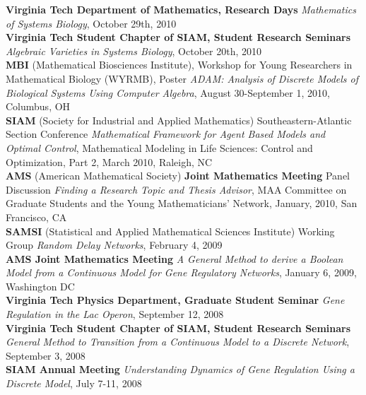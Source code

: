 \documentclass[10pt]{article}
\begin{document}
\textbf{Virginia Tech Department of Mathematics, Research Days}
\textit{Mathematics of Systems Biology}, October 29th, 2010 \\

\textbf{Virginia Tech Student Chapter of SIAM, Student Research Seminars}
\textit{Algebraic Varieties in Systems Biology}, October 20th, 2010 \\

\textbf{MBI} (Mathematical Biosciences Institute), Workshop for Young Researchers 
in Mathematical Biology (WYRMB), Poster \textit{ADAM: Analysis of Discrete
Models of Biological Systems Using Computer Algebra}, August 30-September 1,
2010, Columbus, OH\\

\textbf{SIAM} (Society for Industrial and Applied Mathematics)
Southeastern-Atlantic Section Conference \textit{Mathematical Framework for
Agent Based Models and Optimal Control}, Mathematical Modeling in Life
Sciences: Control and Optimization, Part 2, March 2010, Raleigh, NC\\

\textbf{AMS} (American Mathematical Society) \textbf{Joint Mathematics Meeting} 
Panel Discussion \textit{Finding a Research Topic and Thesis Advisor}, MAA Committee on Graduate
Students and the Young Mathematicians' Network, January, 2010, San Francisco,
CA\\

\textbf{SAMSI} (Statistical and Applied Mathematical Sciences Institute) 
Working Group \textit{Random Delay Networks}, February
4, 2009\\

\textbf{AMS Joint Mathematics Meeting} \textit{A General Method to derive
a Boolean Model from a Continuous Model for Gene Regulatory Networks}, January
6, 2009, Washington DC\\

\textbf{Virginia Tech Physics Department, Graduate Student Seminar}
\textit{Gene Regulation in the Lac Operon}, September 12, 2008\\

\textbf{Virginia Tech Student Chapter of SIAM, Student Research Seminars}
\textit{General Method
to Transition from a Continuous Model to a Discrete Network}, September 3,
2008\\

\textbf{SIAM Annual Meeting} \textit{Understanding Dynamics of
Gene Regulation Using a Discrete Model}, July 7-11, 2008\\
\end{document}
